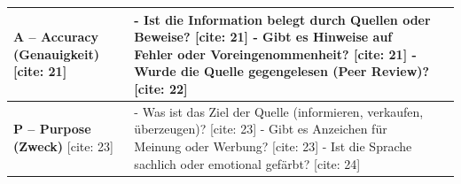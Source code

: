 \begin{longtable}{|>{\raggedright\arraybackslash}p{3cm}|>{\raggedright\arraybackslash}p{6cm}|>{\raggedright\arraybackslash}p{7cm}|}
\textbf{A – Accuracy (Genauigkeit)} [cite: 21] &
- Ist die Information belegt durch Quellen oder Beweise? [cite: 21] \newline
- Gibt es Hinweise auf Fehler oder Voreingenommenheit? [cite: 21] \newline
- Wurde die Quelle gegengelesen (Peer Review)? [cite: 22] &
\\ \hline

\textbf{P – Purpose (Zweck)} [cite: 23] &
- Was ist das Ziel der Quelle (informieren, verkaufen, überzeugen)? [cite: 23] \newline
- Gibt es Anzeichen für Meinung oder Werbung? [cite: 23] \newline
- Ist die Sprache sachlich oder emotional gefärbt? [cite: 24] &
\\ \hline

\end{longtable}
\newpage